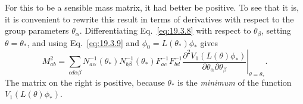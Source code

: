 For this to be a sensible mass matrix, it had better be positive. To see that it is, it is convenient to rewrite this result in terms of derivatives with respect to the group parameters $\theta_\alpha$. Differentiating Eq.~\eqref{eq:19.3.8} with respect to $\theta_\beta$, setting $\theta=\theta_*$, and using Eq.~\eqref{eq:19.3.9} and $\phi_0=L(\theta_*)\phi_*$ gives
\begin{equation}
M_{ab}^2=\sum_{cd\alpha\beta}
N_{a\alpha}^{-1}(\theta_*)N_{b\beta}^{-1}(\theta_*)
F_{ac}^{-1}F_{bd}^{-1}
\left.
\frac{\partial^2 V_1(L(\theta)\phi_*)}
{\partial\theta_\alpha\partial\theta_\beta}
\right|_{\theta=\theta_*}.
\tag{19.3.15}\label{eq:19.3.15}
\end{equation}
The matrix on the right is positive, because $\theta_*$ is the \emph{minimum} of the function $V_1(L(\theta)\phi_*)$.

